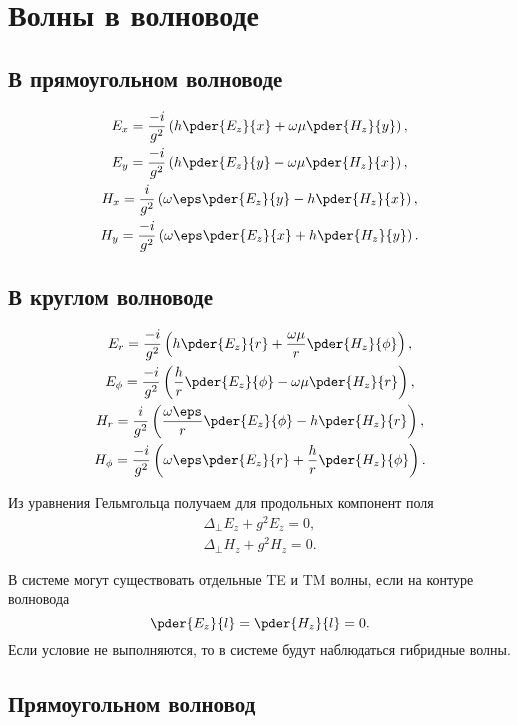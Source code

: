\chapter{Волны в волноводе}
\section{В прямоугольном волноводе}

\begin{gather*}
	E_x = \frac{-i}{g^2}\left(h\pder{E_z}{x} + \omega\mu\pder{H_z}{y}\right),\\
	E_y = \frac{-i}{g^2}\left(h\pder{E_z}{y} - \omega\mu\pder{H_z}{x}\right),\\
	H_x = \frac{i}{g^2}\left(\omega\eps\pder{E_z}{y} - h\pder{H_z}{x}\right),\\
	H_y = \frac{-i}{g^2}\left(\omega\eps\pder{E_z}{x} + h\pder{H_z}{y}\right).
\end{gather*}

\section{В круглом волноводе}
\begin{gather*}
	E_r =    \frac{-i}{g^2}\left(h\pder{E_z}{r} + \frac{\omega\mu}{r}\pder{H_z}{\phi}\right),\\
	E_\phi = \frac{-i}{g^2}\left(\frac{h}{r}\pder{E_z}{\phi} - \omega\mu\pder{H_z}{r}\right),\\
	H_r =    \frac{i}{g^2}\left(\frac{\omega\eps}{r}\pder{E_z}{\phi} - h\pder{H_z}{r}\right),\\
	H_\phi = \frac{-i}{g^2}\left(\omega\eps\pder{E_z}{r} + \frac{h}{r}\pder{H_z}{\phi}\right).
\end{gather*}

Из уравнения Гельмгольца получаем для продольных компонент поля
\begin{gather}
	\Delta_\perp E_z + g^2 E_z = 0,\\
	\Delta_\perp H_z + g^2 H_z = 0.
\end{gather}

В системе могут существовать отдельные TE и TM волны, если на контуре волновода
\[
	\pder{E_z}{l} = \pder{H_z}{l} = 0.
\]
Если условие не выполняются, то в системе будут наблюдаться гибридные волны.

\section{Прямоугольном волновод}

